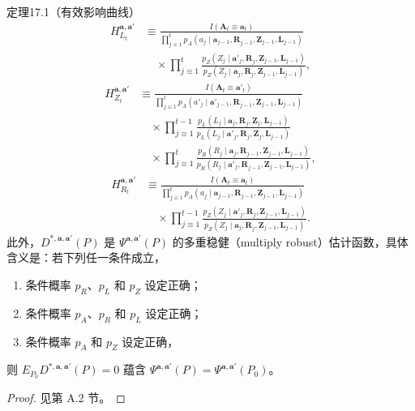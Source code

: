 \begin{bookresult}{定理}{17.1（有效影响曲线）}
\begin{equation}
\begin{aligned}
 H_{L_t}^{\mathbf a,\mathbf a'}
 &\equiv\frac{I(\mathbf A_t\equiv\mathbf a_t)}
 {\prod_{j\equiv1}^t p_A(a_j\mid\mathbf a_{j-1},\mathbf R_{j-1},\mathbf Z_{j-1},\mathbf L_{j-1})}\\
 &\quad{}\times\prod_{j\equiv1}^t
 \frac{p_Z(Z_j\mid\mathbf a'_j,\mathbf R_j,\mathbf Z_{j-1},\mathbf L_{j-1})}
 {p_Z(Z_j\mid\mathbf a_j,\mathbf R_j,\mathbf Z_{j-1},\mathbf L_{j-1})},
\end{aligned}
\tag{17.10}
\end{equation}
\begin{equation}
\begin{aligned}
 H_{Z_t}^{\mathbf a,\mathbf a'}
 &\equiv\frac{I(\mathbf A_t\equiv\mathbf a'_t)}
 {\prod_{j\equiv1}^t p_A(a'_j\mid\mathbf a'_{j-1},\mathbf R_{j-1},\mathbf Z_{j-1},\mathbf L_{j-1})}\\
 &\quad{}\times\prod_{j\equiv1}^{t-1}
 \frac{p_L(L_j\mid\mathbf a_j,\mathbf R_j,\mathbf Z_j,\mathbf L_{j-1})}
 {p_L(L_j\mid\mathbf a'_j,\mathbf R_j,\mathbf Z_j,\mathbf L_{j-1})}\\
 &\quad{}\times\prod_{j\equiv1}^{t}
 \frac{p_R(R_j\mid\mathbf a_j,\mathbf R_{j-1},\mathbf Z_{j-1},\mathbf L_{j-1})}
 {p_R(R_j\mid\mathbf a'_j,\mathbf R_{j-1},\mathbf Z_{j-1},\mathbf L_{j-1})},
\end{aligned}
\tag{17.11}
\end{equation}
\begin{equation}
\begin{aligned}
 H_{R_t}^{\mathbf a,\mathbf a'}
 &\equiv\frac{I(\mathbf A_t\equiv\mathbf a_t)}
 {\prod_{j\equiv1}^t p_A(a_j\mid\mathbf a_{j-1},\mathbf R_{j-1},\mathbf Z_{j-1},\mathbf L_{j-1})}\\
 &\quad{}\times\prod_{j\equiv1}^{t-1}
 \frac{p_Z(Z_j\mid\mathbf a'_j,\mathbf R_j,\mathbf Z_{j-1},\mathbf L_{j-1})}
 {p_Z(Z_j\mid\mathbf a_j,\mathbf R_j,\mathbf Z_{j-1},\mathbf L_{j-1})}.
\end{aligned}
\tag{17.12}
\end{equation}
此外，$D^{*,\mathbf a,\mathbf a'}(P)$ 是 $\Psi^{\mathbf a,\mathbf a'}(P)$ 的多重稳健（multiply robust）估计函数，具体含义是：若下列任一条件成立，
\begin{enumerate}[label=R\arabic*.,leftmargin=2.8em]
 \item 条件概率 $p_R$、$p_L$ 和 $p_Z$ 设定正确；
 \item 条件概率 $p_A$、$p_R$ 和 $p_L$ 设定正确；
 \item 条件概率 $p_A$ 和 $p_Z$ 设定正确，
\end{enumerate}
则 $E_{P_0}D^{*,\mathbf a,\mathbf a'}(P)=0$ 蕴含 $\Psi^{\mathbf a,\mathbf a'}(P)=\Psi^{\mathbf a,\mathbf a'}(P_0)$。
\end{bookresult}
\begin{proof}
见第 A.2 节。
\end{proof}

